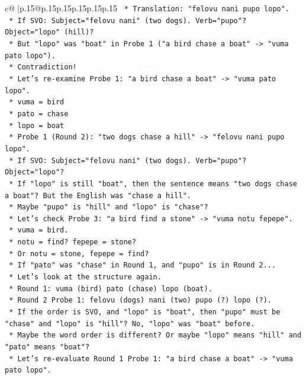 \documentclass{article}
\begin{document}
{\begin{supertabular}{c@{$\;$}|p{.15\linewidth}@{}p{.15\linewidth}p{.15\linewidth}p{.15\linewidth}p{.15\linewidth}p{.15\linewidth}}
{{{\texttt{    *   Translation: "felovu nani pupo lopo".} \\
\texttt{    *   If SVO: Subject="felovu nani" (two dogs). Verb="pupo"? Object="lopo" (hill)?} \\
\texttt{    *   But "lopo" was "boat" in Probe 1 ("a bird chase a boat" {-}> "vuma pato lopo").} \\
\texttt{    *   Contradiction!} \\
\texttt{    *   Let's re{-}examine Probe 1: "a bird chase a boat" {-}> "vuma pato lopo".} \\
\texttt{        *   vuma = bird} \\
\texttt{        *   pato = chase} \\
\texttt{        *   lopo = boat} \\
\texttt{    *   Probe 1 (Round 2): "two dogs chase a hill" {-}> "felovu nani pupo lopo".} \\
\texttt{        *   If SVO: Subject="felovu nani" (two dogs). Verb="pupo"? Object="lopo"?} \\
\texttt{        *   If "lopo" is still "boat", then the sentence means "two dogs chase a boat"? But the English was "chase a hill".} \\
\texttt{        *   Maybe "pupo" is "hill" and "lopo" is "chase"?} \\
\texttt{        *   Let's check Probe 3: "a bird find a stone" {-}> "vuma notu fepepe".} \\
\texttt{        *   vuma = bird.} \\
\texttt{        *   notu = find? fepepe = stone?} \\
\texttt{        *   Or notu = stone, fepepe = find?} \\
\texttt{        *   If "pato" was "chase" in Round 1, and "pupo" is in Round 2...} \\
\texttt{        *   Let's look at the structure again.} \\
\texttt{        *   Round 1: vuma (bird) pato (chase) lopo (boat).} \\
\texttt{        *   Round 2 Probe 1: felovu (dogs) nani (two) pupo (?) lopo (?).} \\
\texttt{        *   If the order is SVO, and "lopo" is "boat", then "pupo" must be "chase" and "lopo" is "hill"? No, "lopo" was "boat" before.} \\
\texttt{        *   Maybe the word order is different? Or maybe "lopo" means "hill" and "pato" means "boat"?} \\
\texttt{        *   Let's re{-}evaluate Round 1 Probe 1: "a bird chase a boat" {-}> "vuma pato lopo".} \\
}}}
\end{supertabular}}
\end{document}

